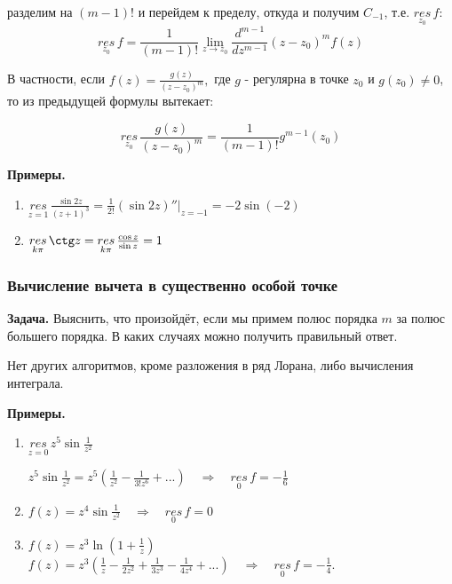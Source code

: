 \documentclass[a4paper, 12pt]{report}
\begin{document}
разделим на $(m-1)!$ и перейдем к пределу, откуда и получим $C_{-1}$, т.е. $\overset{}{\underset{z_0}{res}}\,f:$
$$\overset{}{\underset{z_0}{res}}\,f = \frac{1}{(m-1)!} \lim_{z \to z_0} \frac{d^{m-1}}{dz^{m-1}}(z-z_0)^mf(z) $$

В частности, если $f(z) = \frac{g(z)}{(z-z_0)^m}, $ где $g$ - регулярна в точке $z_0$ и $g(z_0)\neq 0$,  то из предыдущей формулы вытекает:

$$ \overset{}{\underset{z_0}{res}}\, \frac{g(z)}{(z-z_0)^m} = \frac{1}{(m-1)!}g^{m-1}(z_0)   $$

\par\bigskip
\textbf{Примеры.}
\begin{enumerate}
    \item $ \overset{}{\underset{z=1}{res}}\, \frac{\sin 2z}{(z+1)^3} = \frac{1}{2!}(\sin 2z)''|_{z=-1} = -2\sin (-2)  $
    \item $ \overset{}{\underset{k\pi}{res}}\,\ctg z = \overset{}{\underset{k\pi}{res}}\,\frac{\cos z}{\sin z} = 1  $
\end{enumerate}



\subsubsection{Вычисление вычета в существенно особой точке}
\textbf{Задача.} \quad 
Выяснить, что произойдёт, если мы примем полюс порядка $m$ за полюс большего порядка. В каких случаях можно получить правильный ответ.

Нет других алгоритмов, кроме разложения в ряд Лорана, либо вычисления интеграла.
\par\bigskip
\textbf{Примеры.}
\begin{enumerate}
    \item $ \overset{}{\underset{z=0}{res}}\,z^5\sin \frac{1}{z^2}$
    
    $ z^5 \sin \frac{1}{z^2} = z^5(\frac{1}{z^2} - \frac{1}{3!z^6} + ...)\quad \Rightarrow \quad \overset{}{\underset{0}{res}}\, f = -\frac{1}{6}$
    
    \item $f(z) = z^4 \sin \frac{1}{z^2} \quad \Rightarrow \quad \overset{}{\underset{0}{res}}\,f = 0   $
    
    \item $ f(z) = z^3\ln(1+\frac{1}{z})$
    $f(z) = z^3(\frac{1}{z} - \frac{1}{2z^2} + \frac{1}{3z^3} - \frac{1}{4z^4} + ...) \quad \Rightarrow \quad \overset{}{\underset{0}{res}}\,f = - \frac{1}{4}.$
\end{enumerate}
\end{document}
